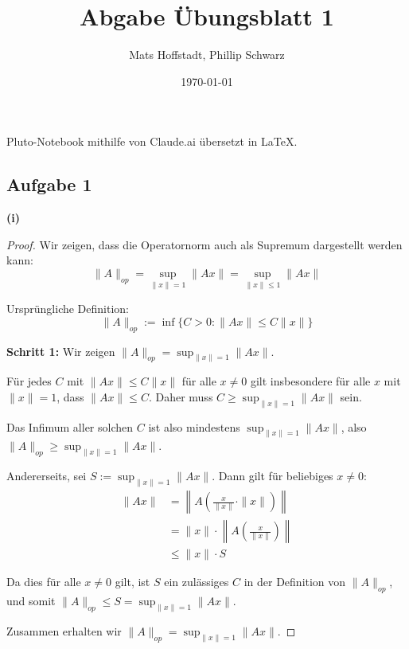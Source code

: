 \documentclass{article}
\title{Abgabe Übungsblatt 1}
\author{Mats Hoffstadt, Phillip Schwarz}
\date{\today}
\begin{document}
\maketitle
\begin{center}
    Pluto-Notebook mithilfe von Claude.ai übersetzt in \LaTeX.    
\end{center}

\clearpage

\subsection*{Aufgabe 1}

\textbf{(i)}
\begin{proof}
    Wir zeigen, dass die Operatornorm auch als Supremum dargestellt werden kann:
    \begin{equation*}
    \|A\|_{op} = \sup_{\|x\|=1} \|Ax\| = \sup_{\|x\|\leq1} \|Ax\|
    \end{equation*}
    
    Ursprüngliche Definition:
    \begin{equation*}
    \|A\|_{op} := \inf\{C > 0 : \|Ax\| \leq C\|x\|\}
    \end{equation*}
    
    \textbf{Schritt 1:} Wir zeigen $\|A\|_{op} = \sup_{\|x\|=1} \|Ax\|$.
    
    Für jedes $C$ mit $\|Ax\| \leq C\|x\|$ für alle $x \neq 0$ gilt insbesondere für alle $x$ mit $\|x\|=1$, dass $\|Ax\| \leq C$. Daher muss $C \geq \sup_{\|x\|=1} \|Ax\|$ sein.
    
    Das Infimum aller solchen $C$ ist also mindestens $\sup_{\|x\|=1} \|Ax\|$, also $\|A\|_{op} \geq \sup_{\|x\|=1} \|Ax\|$.
    
    Andererseits, sei $S := \sup_{\|x\|=1} \|Ax\|$. Dann gilt für beliebiges $x \neq 0$:
    \begin{align*}
    \|Ax\| &= \left\|A\left(\frac{x}{\|x\|} \cdot \|x\|\right)\right\| \\
    &= \|x\| \cdot \left\|A\left(\frac{x}{\|x\|}\right)\right\| \\
    &\leq \|x\| \cdot S
    \end{align*}
    
    Da dies für alle $x \neq 0$ gilt, ist $S$ ein zulässiges $C$ in der Definition von $\|A\|_{op}$, und somit $\|A\|_{op} \leq S = \sup_{\|x\|=1} \|Ax\|$.
    
    Zusammen erhalten wir $\|A\|_{op} = \sup_{\|x\|=1} \|Ax\|$.
    

\end{proof}
\end{document}
